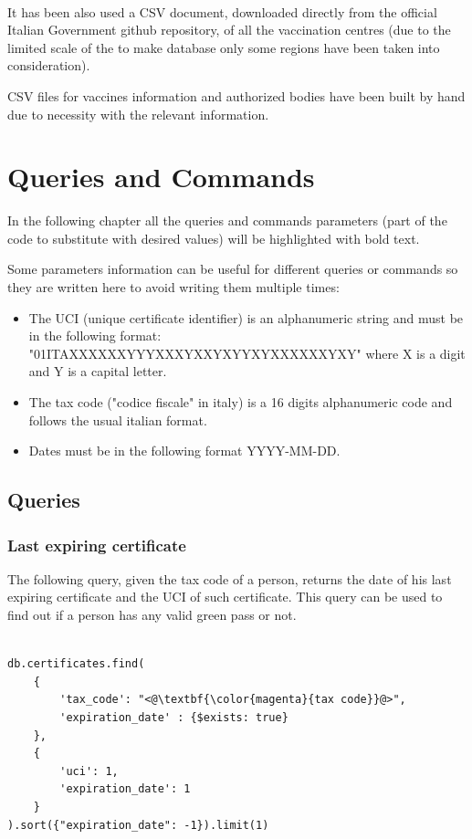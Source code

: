 \documentclass{article}
\begin{document}
\\
\hfill\break
It has been also used a CSV document, downloaded directly from the official Italian Government github repository, of all the vaccination centres (due to the limited scale of the to make database only some regions have been taken into consideration).

CSV files for vaccines information and authorized bodies have been built by hand due to necessity with the relevant information.


\newpage
\section{Queries and Commands}
In the following chapter all the queries and commands parameters (part of the code to substitute with desired values) will be highlighted with \textbf{\color{magenta}{magenta}} bold text. 

Some parameters information can be useful for different queries or commands so they are written here to avoid writing them multiple times:
\begin{itemize}
    \item The UCI (unique certificate identifier) is an alphanumeric string and must be in the following format: \\"01ITAXXXXXXYYYXXXYXXYXYYXYXXXXXXYXY" where X is a digit and Y is a capital letter.
    \item The tax code ("codice fiscale" in italy) is a 16 digits alphanumeric code and follows the usual italian format.
    \item Dates must be in the following format YYYY-MM-DD.
\end{itemize}
\subsection{Queries}
\subsubsection{Last expiring certificate}
The following query, given the tax code of a person, returns the date of his last expiring certificate and the UCI of such certificate. This query can be used to find out if a person
has any valid green pass or not.

\begin{lstlisting}[language=cypher, label=lst:cypher-example]

db.certificates.find(
    {
        'tax_code': "<@\textbf{\color{magenta}{tax code}}@>",
        'expiration_date' : {$exists: true}
    },
    {
        'uci': 1,
        'expiration_date': 1
    }
).sort({"expiration_date": -1}).limit(1)

\end{lstlisting}
\newpage
\end{document}
